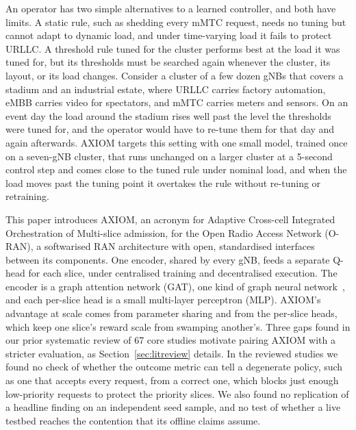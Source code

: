 \documentclass[pdflatex,sn-basic,Numbered]{sn-jnl}
\begin{document}
An operator has two simple alternatives to a learned controller, and both have limits. A static rule, such as shedding every mMTC request, needs no tuning but cannot adapt to dynamic load, and under time-varying load it fails to protect URLLC. A threshold rule tuned for the cluster performs best at the load it was tuned for, but its thresholds must be searched again whenever the cluster, its layout, or its load changes. Consider a cluster of a few dozen gNBs that covers a stadium and an industrial estate, where URLLC carries factory automation, eMBB carries video for spectators, and mMTC carries meters and sensors. On an event day the load around the stadium rises well past the level the thresholds were tuned for, and the operator would have to re-tune them for that day and again afterwards. AXIOM targets this setting with one small model, trained once on a seven-gNB cluster, that runs unchanged on a larger cluster at a 5-second control step and comes close to the tuned rule under nominal load, and when the load moves past the tuning point it overtakes the rule without re-tuning or retraining.

This paper introduces AXIOM, an acronym for Adaptive Cross-cell Integrated Orchestration of Multi-slice admission, for the Open Radio Access Network (O-RAN), a softwarised RAN architecture with open, standardised interfaces between its components. One encoder, shared by every gNB, feeds a separate Q-head for each slice, under centralised training and decentralised execution. The encoder is a graph attention network (GAT), one kind of graph neural network~\cite{jiang2022graphsurvey}, and each per-slice head is a small multi-layer perceptron (MLP). AXIOM's advantage at scale comes from parameter sharing and from the per-slice heads, which keep one slice's reward scale from swamping another's. Three gaps found in our prior systematic review of 67 core studies motivate pairing AXIOM with a stricter evaluation, as Section~\ref{sec:litreview} details. In the reviewed studies we found no check of whether the outcome metric can tell a degenerate policy, such as one that accepts every request, from a correct one, which blocks just enough low-priority requests to protect the priority slices. We also found no replication of a headline finding on an independent seed sample, and no test of whether a live testbed reaches the contention that its offline claims assume.
\end{document}
